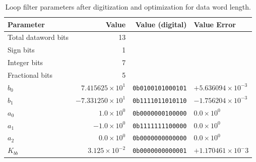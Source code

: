 \begin{table}[h!]
	\centering
	\def\arraystretch{1.5}		
	\setlength\arrayrulewidth{0.75pt}
	\setlength{\tabcolsep}{1em} %
	\begin{tabular}{|l|r|r|l|}
		\hline 
		\rule[-1ex]{0pt}{2.5ex} \cellcolor{gray!40}\textbf{Parameter} & \cellcolor{gray!40}\textbf{Value} & \cellcolor{gray!40}\textbf{Value (digital) } & \cellcolor{gray!40}\textbf{Value Error}\\ 
		\hline 
		\rule[-1ex]{0pt}{2.5ex} Total dataword bits  & 13 & & \\ 
		\hline 
		\rule[-1ex]{0pt}{2.5ex} Sign bits  & 1 & & \\ 
		\hline 
		\rule[-1ex]{0pt}{2.5ex} Integer bits & 7 & & \\ 
		\hline 
		\rule[-1ex]{0pt}{2.5ex} Fractional bits  & 5 & & \\ 
		\hline 
		\rule[-1ex]{0pt}{2.5ex} \textbf{$b_0$} & $7.415625\times10^1$ & \texttt{0b0100101000101}  & $+5.636094\times10^{-3}$\\ 
		\hline 
		\rule[-1ex]{0pt}{2.5ex} \textbf{$b_1$}  & $-7.331250\times10^1$ & \texttt{0b1111011010110}  & $-1.756204\times10^{-3}$\\ 
		\hline 
		\rule[-1ex]{0pt}{2.5ex} \textbf{$a_0$}  & $1.0\times10^0$ & \texttt{0b0000000100000} & $0.0\times10^0$ \\ 
		\hline 
		\rule[-1ex]{0pt}{2.5ex} \textbf{$a_1$}  & $-1.0\times10^0$ & \texttt{0b1111111100000} & $0.0\times10^0$ \\ 
		\hline 
		\rule[-1ex]{0pt}{2.5ex} \textbf{$a_2$}  & $0.0\times10^0$ & \texttt{0b0000000000000} & $0.0\times10^0$ \\ 
		\hline 
		\rule[-1ex]{0pt}{2.5ex} \textbf{$K_{bb}$}  & $3.125\times10^{-2}$ & \texttt{0b0000000000001} & $+1.170461\times10^-3$ \\ 
		\hline 
	\end{tabular} 
	\caption{Loop filter parameters after digitization and optimization for data word length.}
	\label{dig_filter_params}
\end{table}  
\pagebreak

